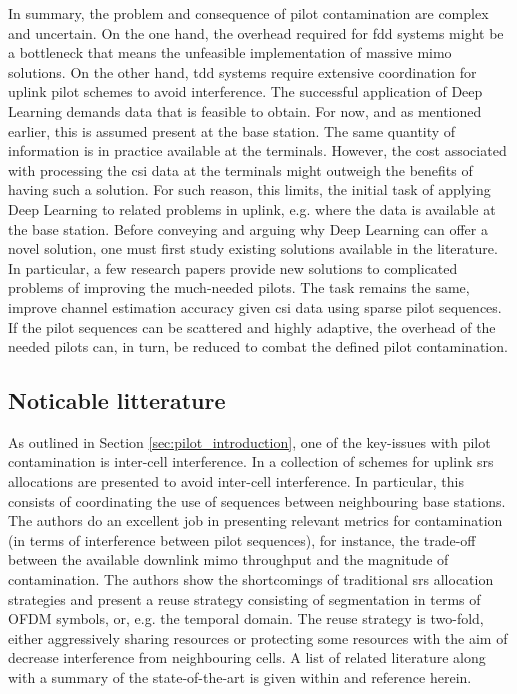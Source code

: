 In summary, the problem and consequence of pilot contamination are complex and uncertain. On the one hand, the overhead required for \gls{fdd} systems might be a bottleneck that means the unfeasible implementation of massive \gls{mimo} solutions. On the other hand, \gls{tdd} systems require extensive coordination for uplink pilot schemes to avoid interference. The successful application of Deep Learning demands data that is feasible to obtain. For now, and as mentioned earlier, this is assumed present at the base station. The same quantity of information is in practice available at the terminals. However, the cost associated with processing the \gls{csi} data at the terminals might outweigh the benefits of having such a solution. For such reason, this limits, the initial task of applying Deep Learning to related problems in uplink, e.g. where the data is available at the base station. Before conveying and arguing why Deep Learning can offer a novel solution, one must first study existing solutions available in the literature. In particular, a few research papers provide new solutions to complicated problems of improving the much-needed pilots. The task remains the same, improve channel estimation accuracy given \gls{csi} data using sparse pilot sequences. If the pilot sequences can be scattered and highly adaptive, the overhead of the needed pilots can, in turn, be reduced to combat the defined pilot contamination. 

\subsection{Noticable litterature}
As outlined in Section \ref{sec:pilot_introduction}, one of the key-issues with pilot contamination is inter-cell interference. In \cite{Galati2017UplinkMIMO} a collection of schemes for uplink \gls{srs} allocations are presented to avoid inter-cell interference. In particular, this consists of coordinating the use of sequences between neighbouring base stations. The authors do an excellent job in presenting relevant metrics for contamination (in terms of interference between pilot sequences), for instance, the trade-off between the available downlink \gls{mimo} throughput and the magnitude of contamination. The authors show the shortcomings of traditional \gls{srs} allocation strategies and present a reuse strategy consisting of segmentation in terms of OFDM symbols, or, e.g. the temporal domain. The reuse strategy is two-fold, either aggressively sharing resources or protecting some resources with the aim of decrease interference from neighbouring cells. A list of related literature along with a summary of the state-of-the-art is given within \cite{Galati2017UplinkMIMO} and reference herein.

